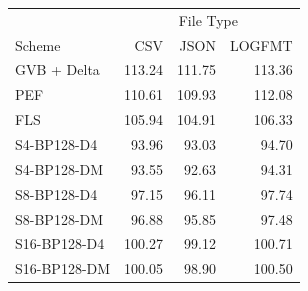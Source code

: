 \begin{tabular}{lrrr}
\toprule
 & \multicolumn{3}{c}{File Type} \\
Scheme & CSV & JSON & LOGFMT \\
\midrule
GVB + Delta & 113.24 & 111.75 & 113.36 \\
PEF & 110.61 & 109.93 & 112.08 \\
FLS & 105.94 & 104.91 & 106.33 \\
S4-BP128-D4 & 93.96 & 93.03 & 94.70 \\
S4-BP128-DM & 93.55 & 92.63 & 94.31 \\
S8-BP128-D4 & 97.15 & 96.11 & 97.74 \\
S8-BP128-DM & 96.88 & 95.85 & 97.48 \\
S16-BP128-D4 & 100.27 & 99.12 & 100.71 \\
S16-BP128-DM & 100.05 & 98.90 & 100.50 \\
\bottomrule
\end{tabular}
